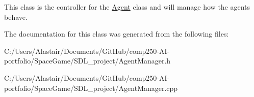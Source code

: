 This class is the controller for the \hyperlink{class_agent}{Agent} class and will manage how the agents behave. 

The documentation for this class was generated from the following files\+:\begin{DoxyCompactItemize}
\item 
C\+:/\+Users/\+Alastair/\+Documents/\+Git\+Hub/comp250-\/\+A\+I-\/portfolio/\+Space\+Game/\+S\+D\+L\+\_\+project/Agent\+Manager.\+h\item 
C\+:/\+Users/\+Alastair/\+Documents/\+Git\+Hub/comp250-\/\+A\+I-\/portfolio/\+Space\+Game/\+S\+D\+L\+\_\+project/Agent\+Manager.\+cpp\end{DoxyCompactItemize}
